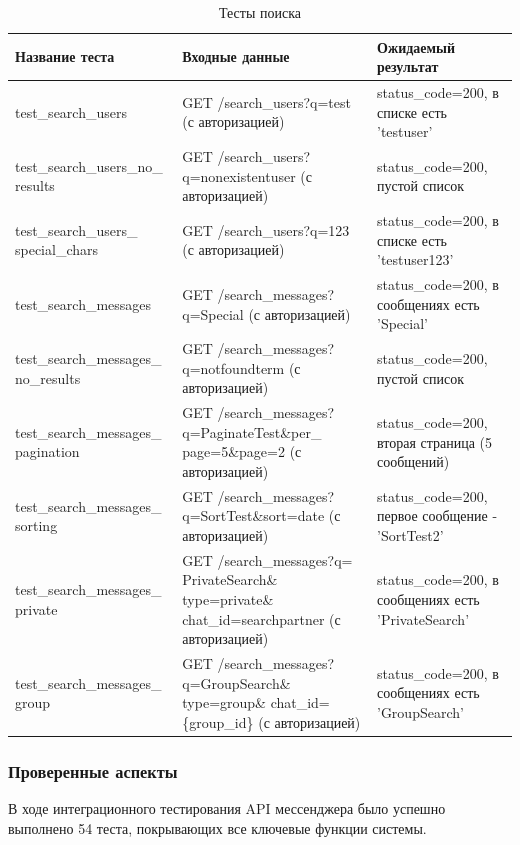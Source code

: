 \begin{xltabular}{\linewidth}{|X|X|X|}
	\caption{Тесты поиска\label{search-tests}}\\ \hline
	\centrow Название теста & \centrow Входные данные & \centrow Ожидаемый результат \\ \hline
	\endfirsthead
	\finishhead
	test\_search\_users & GET /search\_users?q=test (с авторизацией) & status\_code=200, в списке есть 'testuser' \\ \hline
	test\_search\_users\_no\_ results & GET /search\_users? q=nonexistentuser (с авторизацией) & status\_code=200, пустой список \\ \hline
	test\_search\_users\_ special\_chars & GET /search\_users?q=123 (с авторизацией) & status\_code=200, в списке есть 'testuser123' \\ \hline
	test\_search\_messages & GET /search\_messages? q=Special (с авторизацией) & status\_code=200, в сообщениях есть 'Special' \\ \hline
	test\_search\_messages\_ no\_results & GET /search\_messages? q=notfoundterm (с авторизацией) & status\_code=200, пустой список \\ \hline
	test\_search\_messages\_ pagination & GET /search\_messages? q=PaginateTest\&per\_ page=5\&page=2 (с авторизацией) & status\_code=200, вторая страница (5 сообщений) \\ \hline
	test\_search\_messages\_ sorting & GET /search\_messages? q=SortTest\&sort=date (с авторизацией) & status\_code=200, первое сообщение - 'SortTest2' \\ \hline
	test\_search\_messages\_ private & GET /search\_messages?q= PrivateSearch\& type=private\& chat\_id=searchpartner (с авторизацией) & status\_code=200, в сообщениях есть 'PrivateSearch' \\ \hline
	test\_search\_messages\_ group & GET /search\_messages? q=GroupSearch\& type=group\& chat\_id=\{group\_id\} (с авторизацией) & status\_code=200, в сообщениях есть 'GroupSearch' \\ \hline
\end{xltabular}

\subsubsection{Проверенные аспекты}

В ходе интеграционного тестирования API мессенджера было успешно выполнено 54 теста, покрывающих все ключевые функции системы.


